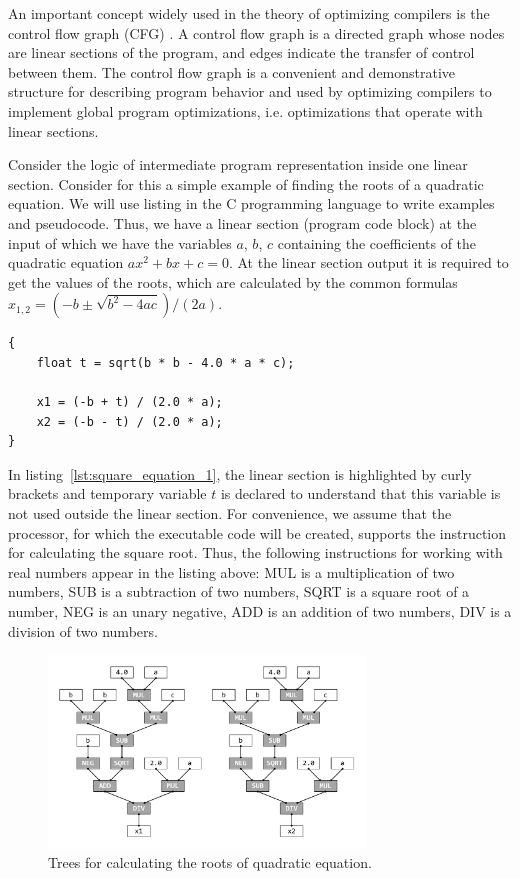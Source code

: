 \documentclass[
11pt,%
tightenlines,%
twoside,%
onecolumn,%
nofloats,%
nobibnotes,%
nofootinbib,%
superscriptaddress,%
noshowpacs,%
centertags]%
{revtex4}
\begin{document}
An important concept widely used in the theory of optimizing compilers is the control flow graph (CFG) \cite{Muchnick}.
A control flow graph is a directed graph whose nodes are linear sections of the program, and edges indicate the transfer of control between them.
The control flow graph is a convenient and demonstrative structure for describing program behavior and used by optimizing compilers to implement global program optimizations, i.e. optimizations that operate with linear sections.

Consider the logic of intermediate program representation inside one linear section.
Consider for this a simple example of finding the roots of a quadratic equation.
We will use listing in the C programming language to write examples and pseudocode.
Thus, we have a linear section (program code block) at the input of which we have the variables $a$, $b$, $c$ containing the coefficients of the quadratic equation $ax^2 + bx + c = 0$.
At the linear section output it is required to get the values of the roots, which are calculated by the common formulas $x_{1,2} = (-b \pm \sqrt{b^2 - 4ac})/(2a)$.

\begin{lstlisting}[caption={Code block for calculating the roots of quadratic equation.},label={lst:square_equation_1}]
{
    float t = sqrt(b * b - 4.0 * a * c);

    x1 = (-b + t) / (2.0 * a);
    x2 = (-b - t) / (2.0 * a);
}
\end{lstlisting}



In listing~\ref{lst:square_equation_1}, the linear section is highlighted by curly brackets and temporary variable $t$ is declared to understand that this variable is not used outside the linear section.
For convenience, we assume that the processor, for which the executable code will be created, supports the instruction for calculating the square root.
Thus, the following instructions for working with real numbers appear in the listing above: MUL is a multiplication of two numbers, SUB is a subtraction of two numbers, SQRT is a square root of a number, NEG is an unary negative, ADD is an addition of two numbers, DIV is a division of two numbers.

\begin{figure}[h]
\includegraphics[width=0.75\textwidth]{pics/square_equation_calculation_tree.pdf}
\caption{Trees for calculating the roots of quadratic equation.}\label{fig:square_equation_calculation_tree}
\end{figure}
\end{document}
